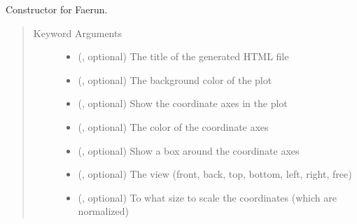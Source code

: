\documentclass[letterpaper,10pt,english]{sphinxmanual}
\begin{document}
\begin{fulllineitems}
\begin{quote}
\begin{description}
\begin{itemize}
\end{itemize}

\end{description}\end{quote}

\begin{fulllineitems}
\label{\detokenize{documentation:faerun.Faerun.__init__}}
Constructor for Faerun.
\begin{quote}\begin{description}
\item[{Keyword Arguments}] \leavevmode\begin{itemize}
\item {} 
 (, optional) \textendash{} The title of the generated HTML file

\item {} 
 (, optional) \textendash{} The background color of the plot

\item {} 
 (, optional) \textendash{} Show the coordinate axes in the plot

\item {} 
 (, optional) \textendash{} The color of the coordinate axes

\item {} 
 (, optional) \textendash{} Show a box around the coordinate axes

\item {} 
 (, optional) \textendash{} The view (front, back, top, bottom, left, right, free)

\item {} 
 (, optional) \textendash{} To what size to scale the coordinates (which are normalized)


\end{itemize}
\end{description}
\end{quote}
\end{fulllineitems}
\end{fulllineitems}
\end{document}
